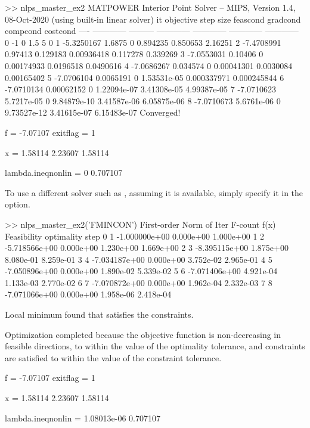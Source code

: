 \documentclass[12pt]{article}
\newcommand{\code}[1]{{\relsize{-0.5}{\tt{{#1}}}}}  %
\numberwithin{equation}{section}
\numberwithin{table}{section}
\numberwithin{figure}{section}
\begin{document}
\begin{Code}
>> nlps_master_ex2
MATPOWER Interior Point Solver -- MIPS, Version 1.4, 08-Oct-2020
 (using built-in linear solver)
 it    objective   step size   feascond     gradcond     compcond     costcond  
----  ------------ --------- ------------ ------------ ------------ ------------
  0            -1                       0          1.5            5            0
  1    -5.3250167     1.6875            0     0.894235     0.850653      2.16251
  2    -7.4708991    0.97413     0.129183   0.00936418     0.117278     0.339269
  3    -7.0553031    0.10406            0   0.00174933    0.0196518    0.0490616
  4    -7.0686267   0.034574            0   0.00041301    0.0030084   0.00165402
  5    -7.0706104  0.0065191            0  1.53531e-05  0.000337971  0.000245844
  6    -7.0710134 0.00062152            0  1.22094e-07  3.41308e-05  4.99387e-05
  7    -7.0710623 5.7217e-05            0  9.84879e-10  3.41587e-06  6.05875e-06
  8    -7.0710673 5.6761e-06            0  9.73527e-12  3.41615e-07  6.15483e-07
Converged!

f = -7.07107   exitflag = 1

x = 
   1.58114
   2.23607
   1.58114

lambda.ineqnonlin =
   0
   0.707107
\end{Code}
To use a different solver such as \code{fmincon}, assuming it is available, simply specify it in the \code{alg} option.
\begin{Code}
>> nlps_master_ex2('FMINCON')
                                            First-order      Norm of
 Iter F-count            f(x)  Feasibility   optimality         step
    0       1   -1.000000e+00    0.000e+00    1.000e+00
    1       2   -5.718566e+00    0.000e+00    1.230e+00    1.669e+00
    2       3   -8.395115e+00    1.875e+00    8.080e-01    8.259e-01
    3       4   -7.034187e+00    0.000e+00    3.752e-02    2.965e-01
    4       5   -7.050896e+00    0.000e+00    1.890e-02    5.339e-02
    5       6   -7.071406e+00    4.921e-04    1.133e-03    2.770e-02
    6       7   -7.070872e+00    0.000e+00    1.962e-04    2.332e-03
    7       8   -7.071066e+00    0.000e+00    1.958e-06    2.418e-04

Local minimum found that satisfies the constraints.

Optimization completed because the objective function is non-decreasing in 
feasible directions, to within the value of the optimality tolerance,
and constraints are satisfied to within the value of the constraint tolerance.


f = -7.07107   exitflag = 1

x = 
   1.58114
   2.23607
   1.58114

lambda.ineqnonlin =
   1.08013e-06
   0.707107
\end{Code}
\end{document}
